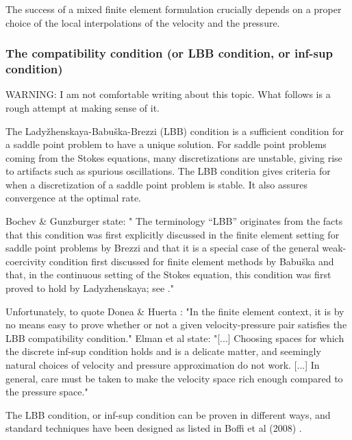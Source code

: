 

The success of a mixed finite element formulation crucially depends on a proper choice of the local interpolations of the velocity and the pressure. 

\subsubsection{The compatibility condition (or LBB condition, or inf-sup condition)}
 

WARNING: I am not comfortable writing about this topic. What follows is a rough attempt at making sense of it.


The Lady{\v z}henskaya-Babu{\v s}ka-Brezzi (LBB) condition is a sufficient 
condition for a saddle point problem to have a unique solution.
For saddle point problems coming from the Stokes equations, 
many discretizations are unstable, giving rise to artifacts such as spurious oscillations. 
The LBB condition gives criteria for when a discretization of a saddle point problem is stable. 
It also assures convergence at the optimal rate. 

Bochev \& Gunzburger \cite{bogu09} state: "
The terminology “LBB” originates from the facts that this condition was first explicitly discussed
in the finite element setting for saddle point problems by Brezzi \cite{brez74} and that it is a special case of
the general weak-coercivity condition first discussed for finite element methods by Babu{\v s}ka
\cite{babu71} and that, in the continuous setting of the Stokes equation, this condition was first proved to
hold by Ladyzhenskaya; see \cite{lady69}."

Unfortunately, to quote Donea \& Huerta \cite{dohu03}: 
"In the finite element context, it is by no means easy to prove whether or not a given
velocity-pressure pair satisfies the LBB compatibility condition."
Elman et al state: "[...] Choosing spaces for which the discrete inf-sup condition holds
and is a delicate matter, and seemingly natural choices of velocity and pressure approximation
do not work. [...] In general, care must be taken to make the velocity space 
rich enough compared to the pressure space."

The LBB condition, or inf-sup condition can be proven in different ways, and standard techniques have been designed
as listed in Boffi et al (2008) \cite{bobf08}.

